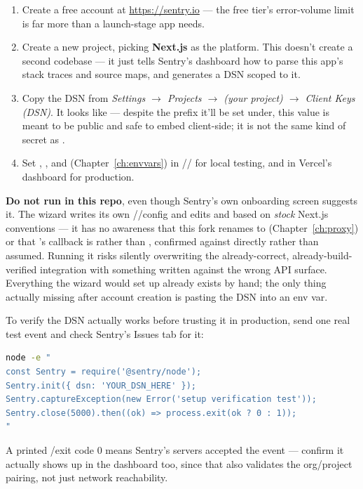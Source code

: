 \begin{enumerate}
  \item Create a free account at \url{https://sentry.io} — the free tier's error-volume limit is far more than a launch-stage app needs.
  \item Create a new project, picking \textbf{Next.js} as the platform. This doesn't create a second codebase — it just tells Sentry's dashboard how to parse this app's stack traces and source maps, and generates a DSN scoped to it.
  \item Copy the DSN from \emph{Settings $\to$ Projects $\to$ (your project) $\to$ Client Keys (DSN)}. It looks like  — despite the  prefix it'll be set under, this value is meant to be public and safe to embed client-side; it is not the same kind of secret as .
  \item Set , , and  (Chapter~\ref{ch:envvars}) in // for local testing, and in Vercel's dashboard for production.
\end{enumerate}

\begin{olkwarn}
\textbf{Do not run  in this repo}, even though Sentry's own onboarding screen suggests it. The wizard writes its own //config and edits  and  based on \emph{stock} Next.js conventions — it has no awareness that this fork renames  to  (Chapter~\ref{ch:proxy}) or that 's callback is  rather than , confirmed against  directly rather than assumed. Running it risks silently overwriting the already-correct, already-build-verified integration with something written against the wrong API surface. Everything the wizard would set up already exists by hand; the only thing actually missing after account creation is pasting the DSN into an env var.
\end{olkwarn}

\begin{olktip}
To verify the DSN actually works before trusting it in production, send one real test event and check Sentry's Issues tab for it:
\begin{lstlisting}[style=olkcodebash, language=bash, caption={One-off delivery check -- not part of the app itself}]
node -e "
const Sentry = require('@sentry/node');
Sentry.init({ dsn: 'YOUR_DSN_HERE' });
Sentry.captureException(new Error('setup verification test'));
Sentry.close(5000).then((ok) => process.exit(ok ? 0 : 1));
"
\end{lstlisting}
A printed /exit code 0 means Sentry's servers accepted the event — confirm it actually shows up in the dashboard too, since that also validates the org/project pairing, not just network reachability.
\end{olktip}

